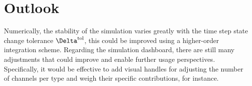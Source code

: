 \section{Outlook}
Numerically, the stability of the simulation varies greatly with the time step state change tolerance $\Delta^{\rm tol}$, this could be improved using a higher-order integration scheme.
Regarding the simulation dashboard, there are still many adjustments that could improve and enable further usage perspectives.
Specifically, it would be effective to add visual handles for adjusting the number of channels per type and weigh their specific contributions, for instance.
